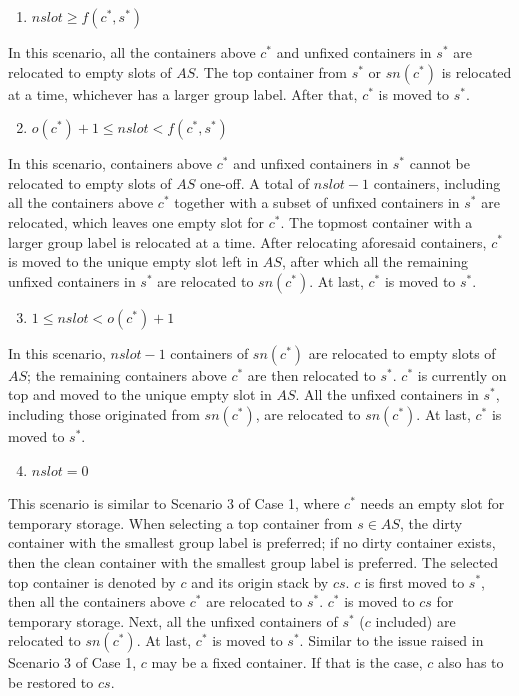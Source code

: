 \documentclass[review,3p,times,authoryear,12pt]{elsarticle}
\begin{document}
\begin{enumerate}
\setcounter{enumi}{0}
\item $\mathit{nslot}\ge f(c^*,s^*)$
\end{enumerate}

In this scenario, all the containers above $c^*$ and unfixed containers in $s^*$ are relocated to empty slots of $\mathit{AS}$. The top container from $s^*$ or $\mathit{sn}(c^*)$ is relocated at a time, whichever has a larger group label. After that, $c^*$ is moved to $s^*$.

\begin{enumerate}
\setcounter{enumi}{1}
\item $o(c^*)+1\le\mathit{nslot}< f(c^*,s^*)$
\end{enumerate}

In this scenario, containers above $c^*$ and unfixed containers in $s^*$ cannot be relocated to empty slots of $\mathit{AS}$ one-off.
A total of $\mathit{nslot}-1$ containers, including all the containers above $c^*$ together with a subset of unfixed containers in $s^*$ are relocated, which leaves one empty slot for $c^*$.
The topmost container with a larger group label is relocated at a time.
After relocating aforesaid containers, $c^*$ is moved to the unique empty slot left in $\mathit{AS}$, after which all the remaining unfixed containers in $s^*$ are relocated to $\mathit{sn}(c^*)$.
At last, $c^*$ is moved to $s^*$.

\begin{enumerate}
\setcounter{enumi}{2}
\item $1\le\mathit{nslot}< o(c^*)+1$
\end{enumerate}

In this scenario, $\mathit{nslot}-1$ containers of $\mathit{sn}(c^*)$ are relocated to empty slots of $\mathit{AS}$; the remaining containers above $c^*$ are then relocated to $s^*$.
$c^*$ is currently on top and moved to the unique empty slot in $\mathit{AS}$.
All the unfixed containers in $s^*$, including those originated from $\mathit{sn}(c^*)$, are relocated to $\mathit{sn}(c^*)$.
At last, $c^*$ is moved to $s^*$.

\begin{enumerate}
\setcounter{enumi}{3}
\item $\mathit{nslot}=0$
\end{enumerate}

This scenario is similar to Scenario 3 of Case 1, where $c^*$ needs an empty slot for temporary storage.
When selecting a top container from $s\in \textit{AS}$, the dirty container with the smallest group label is preferred; if no dirty container exists, then the clean container with the smallest group label is preferred.
The selected top container is denoted by $c$ and its origin stack by $\mathit{cs}$.
$c$ is first moved to $s^*$, then all the containers above $c^*$ are relocated to $s^*$.
$c^*$ is moved to $\mathit{cs}$ for temporary storage.
Next, all the unfixed containers of $s^*$ ($c$ included) are relocated to $\mathit{sn}(c^*)$.
At last, $c^*$ is moved to $s^*$.
Similar to the issue raised in Scenario 3 of Case 1, $c$ may be a fixed container.
If that is the case, $c$ also has to be restored to $\mathit{cs}$.
\end{document}
